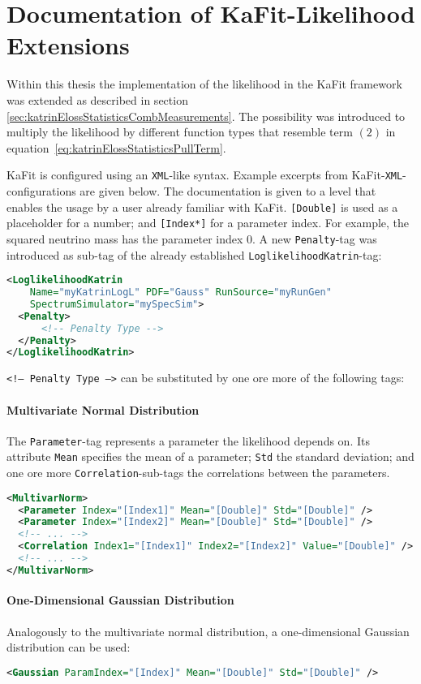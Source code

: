 \section{Documentation of KaFit-Likelihood Extensions}
\label{sec:appendixKatrinElossStatisticsLikelihoodExtKaFitConfig}
Within this thesis the implementation of the likelihood in the KaFit framework was extended as described in section \ref{sec:katrinElossStatisticsCombMeasurements}. The possibility was introduced to multiply the likelihood by different function types that resemble term $(2)$ in equation~\eqref{eq:katrinElossStatisticsPullTerm}. 

KaFit is configured using an \texttt{XML}-like syntax. Example excerpts from KaFit-\texttt{XML}-configurations are given below. The documentation is given to a level that enables the usage by a user already familiar with KaFit. {\color{brown}\texttt{[Double]}} is used as a placeholder for a number; and {\color{brown}\texttt{[Index*]}} for a parameter index. For example, the squared neutrino mass has the parameter index 0. A new \texttt{Penalty}-tag was introduced as sub-tag of the already established \texttt{LoglikelihoodKatrin}-tag:
\begin{lstlisting}[language=XML]
<LoglikelihoodKatrin 
    Name="myKatrinLogL" PDF="Gauss" RunSource="myRunGen" 
    SpectrumSimulator="mySpecSim">
  <Penalty>
      <!-- Penalty Type -->
  </Penalty>
</LoglikelihoodKatrin>
\end{lstlisting}
{\color{gray}\texttt{<!-- Penalty Type -->}} can be substituted by one ore more of the following tags:
\paragraph{Multivariate Normal Distribution}
The {\color{violet}\texttt{Parameter}}-tag represents a parameter the likelihood depends on. Its attribute {\color{magenta}\texttt{Mean}} specifies the mean of a parameter; {\color{magenta}\texttt{Std}} the standard deviation; and one ore more {\color{violet}\texttt{Correlation}}-sub-tags the correlations between the parameters.
\begin{lstlisting}[language=XML]
<MultivarNorm>
  <Parameter Index="[Index1]" Mean="[Double]" Std="[Double]" />
  <Parameter Index="[Index2]" Mean="[Double]" Std="[Double]" />
  <!-- ... -->
  <Correlation Index1="[Index1]" Index2="[Index2]" Value="[Double]" />
  <!-- ... -->
</MultivarNorm>
\end{lstlisting}

\paragraph{One-Dimensional Gaussian Distribution}
Analogously to the multivariate normal distribution, a one-dimensional Gaussian distribution can be used:
\begin{lstlisting}[language=XML]
<Gaussian ParamIndex="[Index]" Mean="[Double]" Std="[Double]" />
\end{lstlisting}

